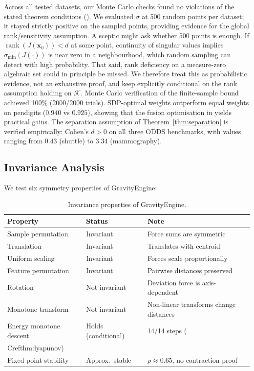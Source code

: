 \documentclass{article}
\DeclareMathOperator{\rank}{rank}
\begin{document}
Across all tested datasets, our Monte Carlo checks found no violations of the stated theorem conditions (). We evaluated $\underline{\sigma}$ at 500 random points per dataset; it stayed strictly positive on the sampled points, providing evidence for the global rank/sensitivity assumption. A sceptic might ask whether 500 points is enough. If $\rank(J(\mathbf{x}_0)) < d$ at some point, continuity of singular values implies $\sigma_{\min}(J(\cdot))$ is near zero in a neighbourhood, which random sampling can detect with high probability. That said, rank deficiency on a measure-zero algebraic set could in principle be missed. We therefore treat this as probabilistic evidence, not an exhaustive proof, and keep  explicitly conditional on the rank assumption holding on $\mathcal{K}$. Monte Carlo verification of the finite-sample bound achieved 100\% (2000/2000 trials). SDP-optimal weights outperform equal weights on pendigits ($0.940$ vs $0.925$), showing that the fusion optimisation in  yields practical gains. The separation assumption of Theorem~\ref{thm:separation} is verified empirically: Cohen's $d > 0$ on all three ODDS benchmarks, with values ranging from $0.43$ (shuttle) to $3.34$ (mammography).

\subsection{Invariance Analysis}

We test six symmetry properties of GravityEngine:

\begin{table}[t]
\centering
\caption{Invariance properties of GravityEngine.}
\label{tab:invariance}
\begin{tabular}{@{}lll@{}}
\toprule
\textbf{Property} & \textbf{Status} & \textbf{Note} \\
\midrule
Sample permutation & Invariant & Force sums are symmetric \\
Translation & Invariant & Translates with centroid \\
Uniform scaling & Invariant & Forces scale proportionally \\
Feature permutation & Invariant & Pairwise distances preserved \\
Rotation & Not invariant & Deviation force is axis-dependent \\
Monotone transform & Not invariant & Non-linear transforms change distances \\
Energy monotone descent & Holds (conditional) & 14/14 steps (\\Cref{thm:lyapunov}) \\
Fixed-point stability & Approx.\ stable & $\rho \approx 0.65$, no contraction proof \\
\bottomrule
\end{tabular}
\end{table}
\end{document}
